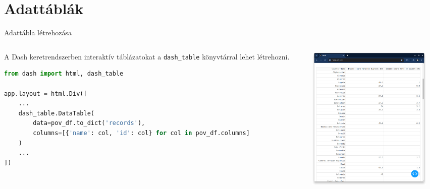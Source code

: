 \documentclass[english, aspectratio=169]{beamer}
\makeatletter
\let\origtableofcontents=\tableofcontents
\def\tableofcontents{\@ifnextchar[{\origtableofcontents}{\gobbletableofcontents}}
\def\gobbletableofcontents#1{\origtableofcontents}
\makeatother
\begin{document}
\section{Adattáblák}

\begin{frame}{}
	\tableofcontents[currentsection]
\end{frame}

\begin{frame}[fragile]{Adattábla létrehozása}
	\begin{columns}
		\begin{column}{.5\textwidth}
			A Dash keretrendszerben interaktív táblázatokat a \texttt{dash\_table} könyvtárral lehet létrehozni.\par\medskip
			\begin{lstlisting}[language=python]
from dash import html, dash_table

app.layout = html.Div([
	...
	dash_table.DataTable(
		data=pov_df.to_dict('records'),
		columns=[{'name': col, 'id': col} for col in pov_df.columns]
	)
	...
])

			\end{lstlisting}
		\end{column}
		\begin{column}{.5\textwidth}
			\begin{center}
				\includegraphics[width=7cm, height=7cm, keepaspectratio]{images/freq_12.png}
			\end{center}
		\end{column}
	\end{columns}
\end{frame}
\end{document}
